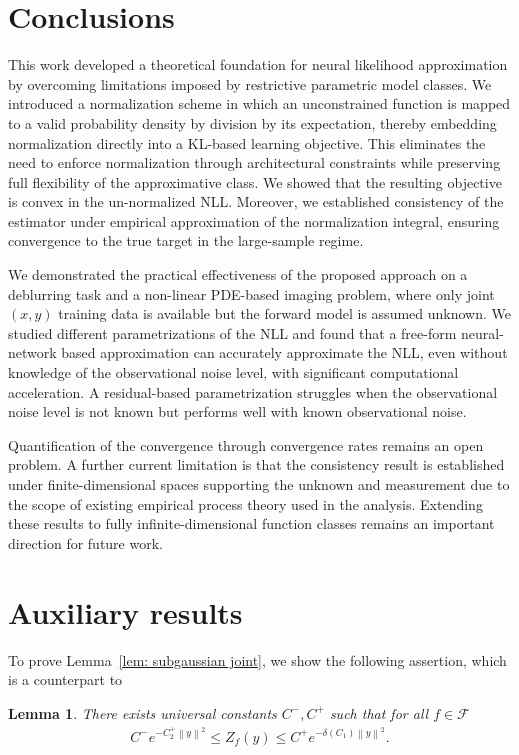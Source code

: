 \documentclass{amsart}
\newtheorem{lemma}[theorem]{Lemma}
\theoremstyle{definition}
\newcommand{\norm}[1]{\left\|#1\right\|}
\newcommand{\F}{\mathcal{F}}
\begin{document}
\section{Conclusions}\label{s:Conclusions}
This work developed a theoretical foundation for neural likelihood approximation by overcoming limitations imposed by restrictive parametric model classes. We introduced a normalization scheme in which an unconstrained function is mapped to a valid probability density by division by its expectation, thereby embedding normalization directly into a KL-based learning objective. This eliminates the need to enforce normalization through architectural constraints while preserving full flexibility of the approximative class. We showed that the resulting objective is convex in the un-normalized NLL. Moreover, we established consistency of the estimator under empirical approximation of the normalization integral, ensuring convergence to the true target in the large-sample regime.

We demonstrated the practical effectiveness of the proposed approach on a deblurring task and a non-linear PDE-based imaging problem, where only joint $(x, y)$ training data is available but the forward model is assumed unknown. We studied different parametrizations of the NLL and found that a free-form neural-network based approximation can accurately approximate the NLL, even without knowledge of the observational noise level, with significant computational acceleration. A residual-based parametrization struggles when the observational noise level is not known but performs well with known observational noise.

Quantification of the convergence through convergence rates remains an open problem. A further current limitation is that the consistency result is established under finite-dimensional spaces supporting the unknown and measurement due to the scope of existing empirical process theory used in the analysis. Extending these results to fully infinite-dimensional function classes remains an important direction for future work.

\FloatBarrier

\appendix
\section{Auxiliary results}


To prove Lemma~\ref{lem: subgaussian joint}, we show the following assertion, which is a counterpart to \cite[Lemma 3.11]{helin2025bayesianoptimalexperimentaldesign}
\begin{lemma}\label{lem: Z_fy bounds}
    There exists universal constants $C^-, C^+$ such that for all $f \in \F$
    \begin{eqnarray*}
        C^-  e^{-C_2^+ \norm{y}^2}   \le Z_f(y) \le C^+ e^{- \delta(C_1) \norm{y}^2} .
    \end{eqnarray*}
\end{lemma}
\end{document}

